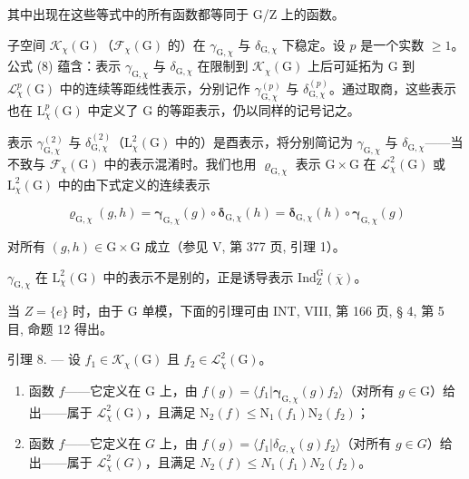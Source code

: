 其中出现在这些等式中的所有函数都等同于 G/Z 上的函数。

 子空间 \(\mathcal{K}_{\chi}(\mathrm{G})\)（\(\mathcal{F}_{\chi}(\mathrm{G})\) 的）在 \(\gamma_{\mathrm{G},\chi}\) 与 \(\delta_{\mathrm{G},\chi}\) 下稳定。设 \(p\) 是一个实数 \(\geqslant 1\)。公式 (8) 蕴含：表示 \(\gamma_{\mathrm{G},\chi}\) 与 \(\delta_{\mathrm{G},\chi}\) 在限制到 \(\mathcal{K}_{\chi}(\mathrm{G})\) 上后可延拓为 G 到 \(\mathcal{L}_{\chi}^{p}(\mathrm{G})\) 中的连续等距线性表示，分别记作 \(\gamma_{\mathrm{G},\chi}^{(p)}\) 与 \(\delta_{\mathrm{G},\chi}^{(p)}\)。通过取商，这些表示也在 \(\mathrm{L}_{\chi}^{p}(\mathrm{G})\) 中定义了 G 的等距表示，仍以同样的记号记之。

 表示 \(\gamma_{\mathrm{G},\chi}^{(2)}\) 与 \(\delta_{\mathrm{G},\chi}^{(2)}\)（\(\mathrm{L}_{\chi}^{2}(\mathrm{G})\) 中的）是酉表示，将分别简记为 \(\gamma_{\mathrm{G},\chi}\) 与 \(\delta_{\mathrm{G},\chi}\)——当不致与 \(\mathcal{F}_{\chi}(\mathrm{G})\) 中的表示混淆时。我们也用 \(\varrho_{\mathrm{G},\chi}\) 表示 \(\mathrm{G} \times \mathrm{G}\) 在 \(\mathcal{L}_{\chi}^{2}(\mathrm{G})\) 或 \(\mathrm{L}_{\chi}^{2}(\mathrm{G})\) 中的由下式定义的连续表示

\[
\pmb {\varrho} _ {\mathrm{G}, \chi} (g, h) = \pmb {\gamma} _ {\mathrm{G}, \chi} (g) \circ \pmb {\delta} _ {\mathrm{G}, \chi} (h) = \pmb {\delta} _ {\mathrm{G}, \chi} (h) \circ \pmb {\gamma} _ {\mathrm{G}, \chi} (g)
\]

对所有 \((g,h)\in \mathrm{G}\times \mathrm{G}\) 成立（参见 V, 第 377 页, 引理 1）。

\(\gamma_{\mathrm{G},\chi}\) 在 \(\mathrm{L}_{\chi}^{2}(\mathrm{G})\) 中的表示不是别的，正是诱导表示 \(\mathrm{Ind}_{\mathrm{Z}}^{\mathrm{G}}(\overline{\chi})\)。

当 \(Z = \{e\}\) 时，由于 G 单模，下面的引理可由 INT, VIII, 第 166 页, § 4, 第 5 目, 命题 12 得出。

引理 8. --- 设 \(f_1 \in \mathcal{K}_\chi(\mathrm{G})\) 且 \(f_2 \in \mathcal{L}_\chi^2(\mathrm{G})\)。

\begin{enumerate}
\def\labelenumi{\alph{enumi})}
\item
  函数 \(f\)——它定义在 \(\mathrm{G}\) 上，由 \(f(g) = \langle f_1 | \boldsymbol{\gamma}_{\mathrm{G},\chi}(g)f_2 \rangle\)（对所有 \(g \in \mathrm{G}\)）给出——属于 \(\mathcal{L}_{\chi}^{2}(\mathrm{G})\)，且满足 \(\mathrm{N}_2(f) \leqslant \mathrm{N}_1(f_1)\mathrm{N}_2(f_2)\)；
\item
  函数 \(f\)——它定义在 \(G\) 上，由 \(f(g) = \langle f_1 | \delta_{G,\chi}(g)f_2 \rangle\)（对所有 \(g \in G\)）给出——属于 \(\mathcal{L}_{\chi}^{2}(G)\)，且满足 \(N_2(f) \leqslant N_1(f_1)N_2(f_2)\)。
\end{enumerate}


